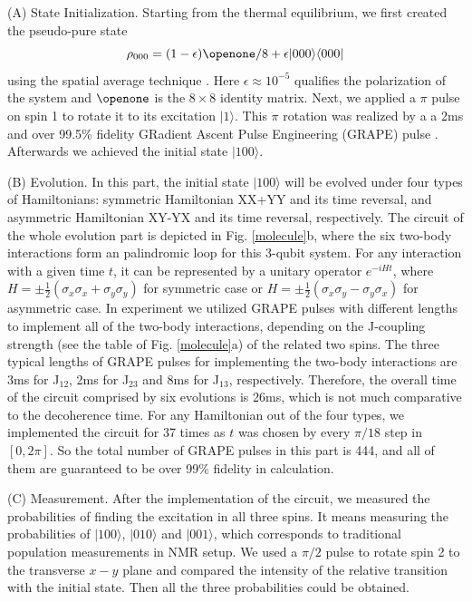 \documentclass[aps,pra,12pt,nofootinbib,superscriptaddress,longbibliography,showpacs]{revtex4-1}
\theoremstyle{plain}
\theoremstyle{definition}
\newcommand{\bra}[1]{\mbox{$\langle #1|$}}
\newcommand{\ket}[1]{\ensuremath{|#1\rangle}}
\begin{document}
(A) State Initialization. Starting from the thermal equilibrium, we first created the pseudo-pure state
\begin{equation}
\rho_{000}=(1-\epsilon)\openone/8+\epsilon \ket{000} \bra{000}
\end{equation}
using the spatial average technique \cite{spatial}. Here $\epsilon \approx 10^{-5}$ qualifies the polarization of the system and $\openone$ is the $8\times 8$ identity matrix. Next, we applied a $\pi$ pulse on spin 1 to rotate it to its excitation $\ket{1}$. This $\pi$ rotation was realized by a  a 2ms and over 99.5\% fidelity GRadient Ascent Pulse Engineering (GRAPE) pulse \cite{grape1,grape2}. Afterwards we achieved the initial state $\ket{100}$.

(B) Evolution. In this part, the initial state $\ket{100}$ will be evolved under four types of Hamiltonians: symmetric Hamiltonian XX+YY and its time reversal, and asymmetric Hamiltonian XY-YX and its time reversal, respectively. The circuit of the whole evolution part is depicted in Fig. \ref{molecule}b, where the six two-body interactions form an palindromic loop for this 3-qubit system. For any interaction with a given time $t$, it can be represented by a unitary operator $e^{-iHt}$, where $H=\pm\frac{1}{2}(\sigma_x\sigma_x+\sigma_y\sigma_y)$ for symmetric case or $H=\pm\frac{1}{2}(\sigma_x\sigma_y-\sigma_y\sigma_x)$ for asymmetric case. In experiment we utilized GRAPE pulses with different lengths to implement all of the two-body interactions, depending on the J-coupling strength (see the table of Fig. \ref{molecule}a) of the related two spins. The three typical lengths of GRAPE pulses for implementing the two-body interactions are 3ms for J$_{12}$, 2ms for J$_{23}$ and 8ms for J$_{13}$, respectively. Therefore, the overall time of the circuit comprised by six evolutions is 26ms, which is not much comparative to the decoherence time. For any Hamiltonian out of the four types, we implemented the circuit for 37 times as $t$ was chosen by every $\pi/18$ step in $[0, 2\pi]$. So the total number of GRAPE pulses in this part is 444, and all of them are guaranteed to be over 99\% fidelity in calculation.

(C) Measurement. After the implementation of the circuit, we measured the probabilities of finding the excitation in all three spins. It means measuring the probabilities of  $\ket{100}$, $\ket{010}$ and $\ket{001}$, which corresponds to traditional population measurements in NMR setup. We used a $\pi/2$ pulse to rotate spin 2 to the transverse $x-y$ plane and compared the intensity of the relative transition with the initial state. Then all the three probabilities could be obtained.
\end{document}
